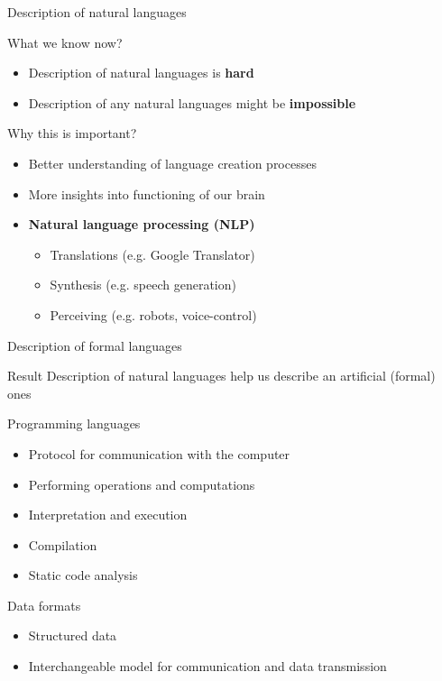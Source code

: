 \documentclass{beamer}
\begin{document}
\begin{frame}{Description of natural languages}

\begin{block}{What we know now?}
\begin{itemize}
\item Description of natural languages is \textbf{hard}
\item Description of any natural languages might be \textbf{impossible}
\end{itemize}
\end{block}

\begin{block}{Why this is important?}
\begin{itemize}
\item Better understanding of language creation processes
\item More insights into functioning of our brain
\item \textbf{Natural language processing (NLP)}
\begin{itemize}
\item Translations (e.g. Google Translator)
\item Synthesis (e.g. speech generation)
\item Perceiving (e.g. robots, voice-control)
\end{itemize}
\end{itemize}
\end{block}

\end{frame}


\begin{frame}{Description of formal languages}

\begin{alertblock}{Result}
Description of natural languages help us describe an artificial (formal) ones
\end{alertblock}

\begin{block}{Programming languages}
\begin{itemize}
\item Protocol for communication with the computer
\item Performing operations and computations
\item Interpretation and execution
\item Compilation
\item Static code analysis
\end{itemize}
\end{block}

\begin{block}{Data formats}
\begin{itemize}
\item Structured data
\item Interchangeable model for communication and data transmission
\end{itemize}
\end{block}

\end{frame}
\end{document}
